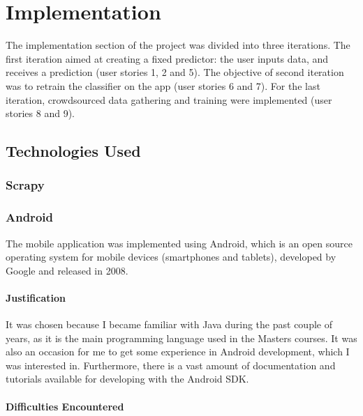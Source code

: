 \documentclass{mproj}
\begin{document}
\chapter{Implementation}\label{implementation}

The implementation section of the project was divided into three iterations. 
The first iteration aimed at creating a fixed predictor: the user inputs data, and receives a prediction (user stories 1, 2 and 5). 
The objective of second iteration was to retrain the classifier on the app (user stories 6 and 7). 
For the last iteration, crowdsourced data gathering and training were implemented (user stories 8 and 9). \par

\section{Technologies Used}

\subsection{Scrapy}\label{scrapy}

\subsection{Android}

The mobile application was implemented using Android, which is an open source operating system for mobile devices (smartphones and tablets), developed by Google and released in 2008.\cite{androidrelease}

\subsubsection*{Justification}

It was chosen because I became familiar with Java during the past couple of years, as it is the main programming language used in the Masters courses. It was also an occasion for me to get some experience in Android development, which I was interested in. Furthermore, there is a vast amount of documentation and tutorials available for developing with the Android SDK. \cite{androidtutorials} \cite{thebignerdranchguide}

\subsubsection*{Difficulties Encountered}
\end{document}
